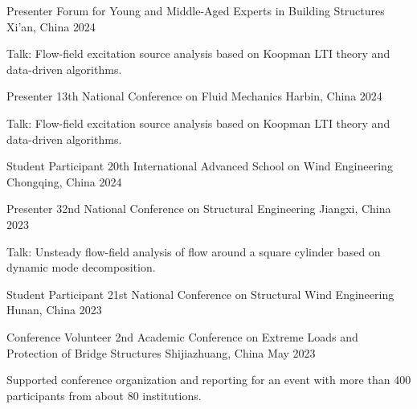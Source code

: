 
\begin{cventries}

  \cventry
    {Presenter}
    {Forum for Young and Middle-Aged Experts in Building Structures}
    {Xi'an, China}
    {2024}
    {
      \begin{cvitems}
        \item {Talk: Flow-field excitation source analysis based on Koopman LTI theory and data-driven algorithms.}
      \end{cvitems}
    }

  \cventry
    {Presenter}
    {13th National Conference on Fluid Mechanics}
    {Harbin, China}
    {2024}
    {
      \begin{cvitems}
        \item {Talk: Flow-field excitation source analysis based on Koopman LTI theory and data-driven algorithms.}
      \end{cvitems}
    }

  \cventry
    {Student Participant}
    {20th International Advanced School on Wind Engineering}
    {Chongqing, China}
    {2024}
    {}

  \cventry
    {Presenter}
    {32nd National Conference on Structural Engineering}
    {Jiangxi, China}
    {2023}
    {
      \begin{cvitems}
        \item {Talk: Unsteady flow-field analysis of flow around a square cylinder based on dynamic mode decomposition.}
      \end{cvitems}
    }

  \cventry
    {Student Participant}
    {21st National Conference on Structural Wind Engineering}
    {Hunan, China}
    {2023}
    {}

  \cventry
    {Conference Volunteer}
    {2nd Academic Conference on Extreme Loads and Protection of Bridge Structures}
    {Shijiazhuang, China}
    {May 2023}
    {
      \begin{cvitems}
        \item {Supported conference organization and reporting for an event with more than 400 participants from about 80 institutions.}
      \end{cvitems}
    }

\end{cventries}
